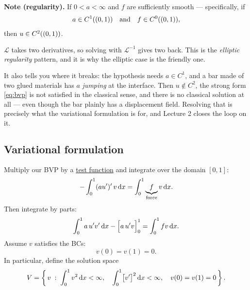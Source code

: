 
\medskip
\noindent\textbf{Note (regularity).} If $0<a<\infty$ and $f$ are sufficiently
smooth --- specifically, if
\[
  a \in \Ck[(0,1)]{1}\quad\text{and}\quad f\in\Ck[(0,1)]{0},
\]
then $u\in\Ck[(0,1)]{2}$.

\begin{intuition}
$\mathcal{L}$ takes two derivatives, so solving with $\mathcal{L}^{-1}$ gives
two back. This is the \emph{elliptic regularity} pattern, and it is why the
elliptic case is the friendly one.

It also tells you where it breaks: the hypothesis needs $a\in C^{1}$, and a bar
made of two glued materials has $a$ \emph{jumping} at the interface. Then
$u\notin C^{2}$, the strong form \eqref{eq:bvp} is not satisfied in the
classical sense, and there is no classical solution at all --- even though the
bar plainly has a displacement field. Resolving that is precisely what the
variational formulation is for, and Lecture 2 closes the loop on it.
\end{intuition}

\subsection*{Variational formulation}

Multiply our BVP by a \underline{test function} and integrate over the domain
$[0,1]$:
\begin{equation}\label{eq:mult}
  -\int_{0}^{1}(au')'\,v\dx = \int_{0}^{1} \underbrace{f}_{\text{force}} v\dx .
\end{equation}
Then integrate by parts:
\begin{equation}\label{eq:ibp1d}
  \int_{0}^{1} a\,u'v'\dx - \Bigl[a\,u'v\Bigr]_{0}^{1} = \int_{0}^{1} f v\dx .
\end{equation}
Assume $v$ satisfies the BCs:
\[
  v(0)=v(1)=0 .
\]
In particular, define the solution space
\begin{equation}\label{eq:Vdef}
  V = \left\{\, v \;:\;
    \int_{0}^{1} v^{2}\dx < \infty,\quad
    \int_{0}^{1} \bigl[v'\bigr]^{2}\dx < \infty,\quad
    v(0)=v(1)=0 \,\right\}.
\end{equation}

